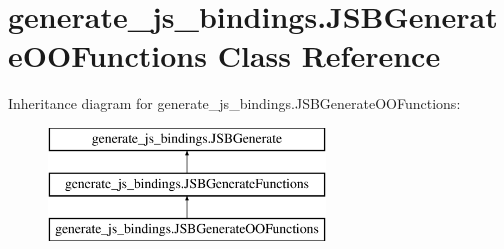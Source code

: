 \hypertarget{classgenerate__js__bindings_1_1_j_s_b_generate_o_o_functions}{\section{generate\-\_\-js\-\_\-bindings.\-J\-S\-B\-Generate\-O\-O\-Functions Class Reference}
\label{classgenerate__js__bindings_1_1_j_s_b_generate_o_o_functions}
}
Inheritance diagram for generate\-\_\-js\-\_\-bindings.\-J\-S\-B\-Generate\-O\-O\-Functions\-:\begin{figure}[H]
\begin{center}
\leavevmode
\includegraphics[height=3.000000cm]{classgenerate__js__bindings_1_1_j_s_b_generate_o_o_functions}
\end{center}
\end{figure}
